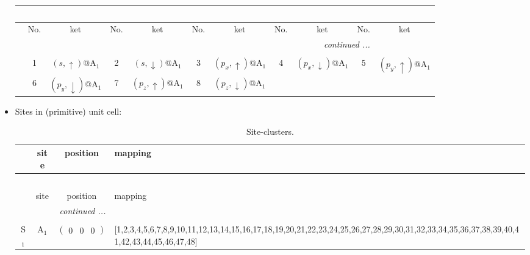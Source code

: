 \documentclass[fleqn,10pt,landscape]{article}
\begin{document}
\begin{itemize}
\begin{center}
\begin{longtable}{c|cc|cc|cc|cc|cc}
\multicolumn{10}{l}{\tablename\ \thetable{}} \\
 \hline \hline
 & No. & ket & No. & ket & No. & ket & No. & ket & No. & ket \\ \hline \endhead

 \hline \hline
\multicolumn{10}{r}{\footnotesize\it continued ...} \\ \endfoot

 \hline \hline
\multicolumn{10}{r}{} \\ \endlastfoot

 & 1 & $(s,\uparrow)$@A$_{1}$ & 2 & $(s,\downarrow)$@A$_{1}$ & 3 & $(p_{x},\uparrow)$@A$_{1}$ & 4 & $(p_{x},\downarrow)$@A$_{1}$ & 5 & $(p_{y},\uparrow)$@A$_{1}$ \\
& 6 & $(p_{y},\downarrow)$@A$_{1}$ & 7 & $(p_{z},\uparrow)$@A$_{1}$ & 8 & $(p_{z},\downarrow)$@A$_{1}$ &  &  &  &  \\
\end{longtable}
\end{center}

\item Sites in (primitive) unit cell:
\begin{center}
\renewcommand{\arraystretch}{1.3}
\begin{longtable}{cc|c|l}
\caption{Site-clusters.}
 \\
 \hline \hline
 & site & position & mapping \\ \hline \endfirsthead

\multicolumn{3}{l}{\tablename\ \thetable{}} \\
 \hline \hline
 & site & position & mapping \\ \hline \endhead

 \hline \hline
\multicolumn{3}{r}{\footnotesize\it continued ...} \\ \endfoot

 \hline \hline
\multicolumn{3}{r}{} \\ \endlastfoot

S$_{1}$ & A$_1$ & $\begin{pmatrix} 0 & 0 & 0 \end{pmatrix}$ & [1,2,3,4,5,6,7,8,9,10,11,12,13,14,15,16,17,18,19,20,21,22,23,24,25,26,27,28,29,30,31,32,33,34,35,36,37,38,39,40,41,42,43,44,45,46,47,48] \\
\end{longtable}
\end{center}


\end{itemize}
\end{document}
